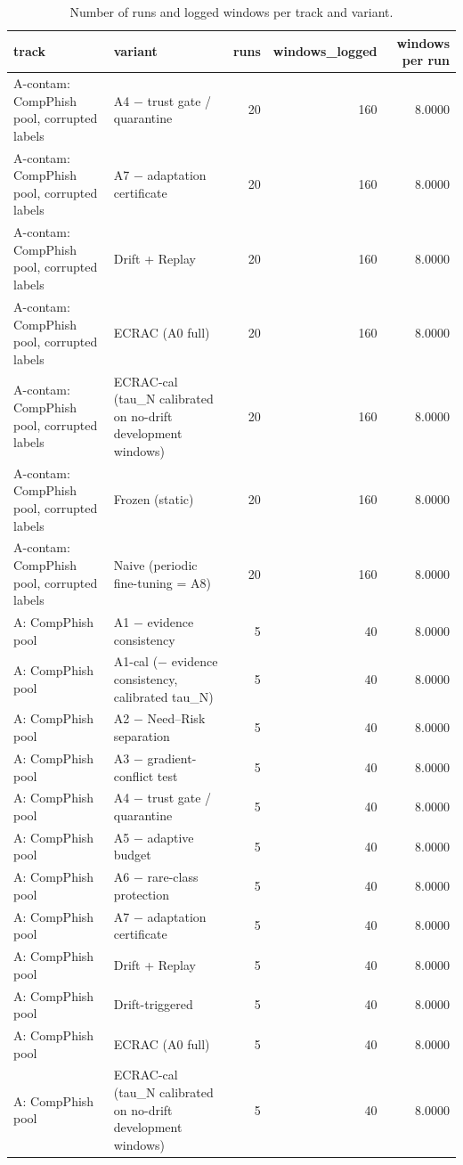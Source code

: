 \begin{table}[t]
\centering
\scriptsize
\caption{Number of runs and logged windows per track and variant.}
\label{tab:rev_R12_ecrac_window_bookkeeping}
\begin{tabular}{llrrr}
\toprule
track & variant & runs & windows\_logged & windows per run \\
\midrule
A-contam: CompPhish pool, corrupted labels & A4 − trust gate / quarantine & 20 & 160 & 8.0000 \\
A-contam: CompPhish pool, corrupted labels & A7 − adaptation certificate & 20 & 160 & 8.0000 \\
A-contam: CompPhish pool, corrupted labels & Drift + Replay & 20 & 160 & 8.0000 \\
A-contam: CompPhish pool, corrupted labels & ECRAC (A0 full) & 20 & 160 & 8.0000 \\
A-contam: CompPhish pool, corrupted labels & ECRAC-cal (tau\_N calibrated on no-drift development windows) & 20 & 160 & 8.0000 \\
A-contam: CompPhish pool, corrupted labels & Frozen (static) & 20 & 160 & 8.0000 \\
A-contam: CompPhish pool, corrupted labels & Naive (periodic fine-tuning = A8) & 20 & 160 & 8.0000 \\
A: CompPhish pool & A1 − evidence consistency & 5 & 40 & 8.0000 \\
A: CompPhish pool & A1-cal (− evidence consistency, calibrated tau\_N) & 5 & 40 & 8.0000 \\
A: CompPhish pool & A2 − Need–Risk separation & 5 & 40 & 8.0000 \\
A: CompPhish pool & A3 − gradient-conflict test & 5 & 40 & 8.0000 \\
A: CompPhish pool & A4 − trust gate / quarantine & 5 & 40 & 8.0000 \\
A: CompPhish pool & A5 − adaptive budget & 5 & 40 & 8.0000 \\
A: CompPhish pool & A6 − rare-class protection & 5 & 40 & 8.0000 \\
A: CompPhish pool & A7 − adaptation certificate & 5 & 40 & 8.0000 \\
A: CompPhish pool & Drift + Replay & 5 & 40 & 8.0000 \\
A: CompPhish pool & Drift-triggered & 5 & 40 & 8.0000 \\
A: CompPhish pool & ECRAC (A0 full) & 5 & 40 & 8.0000 \\
A: CompPhish pool & ECRAC-cal (tau\_N calibrated on no-drift development windows) & 5 & 40 & 8.0000 \\

\end{tabular}
\end{table}
